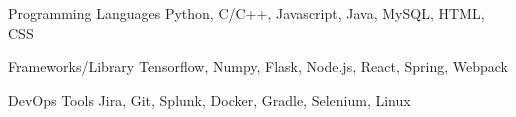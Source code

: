 

\begin{cvskills}


\cvskill
{Programming Languages} %
{Python, C/C++, Javascript, Java, MySQL, HTML, CSS} %

\cvskill
  {Frameworks/Library} %
  {Tensorflow, Numpy, Flask, Node.js, React, Spring, Webpack} %
  
\cvskill
{DevOps Tools}
{Jira, Git, Splunk, Docker, Gradle, Selenium, Linux}

\end{cvskills}
